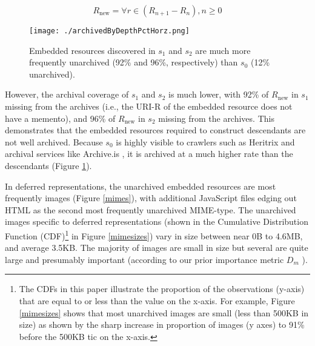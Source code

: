 \documentclass{sig-alternate}
\begin{document}
\begin{equation}
 R_{\text{new}} = \forall r \in (R_{n+1} - R_n), n \geq 0
\label{newER}
\end{equation}


\begin{figure}
\centering
\texttt{[image: ./archivedByDepthPctHorz.png]}
\caption{Embedded resources discovered in $s_1$ and $s_2$ are much more frequently unarchived (92\% and 96\%, respectively) than $s_0$ (12\% unarchived).}
\label{depth}
\end{figure}


However, the archival coverage of $s_1$ and $s_2$ is much lower, with 92\% of $R_{\text{new}}$ in $s_1$ missing from the archives (i.e., the URI-R of the embedded resource does not have a memento), and 96\% of $R_{\text{new}}$ in $s_2$ missing from the archives. This demonstrates that the embedded resources required to construct descendants are not well archived. Because $s_0$ is highly visible to crawlers such as Heritrix and archival services like Archive.is \cite{archivetoday}, it is archived at a much higher rate than the descendants (Figure \ref{depth}).



In deferred representations, the unarchived embedded resources are most frequently images (Figure \ref{mimes}), with additional JavaScript files edging out HTML as the second most frequently unarchived MIME-type. The unarchived images specific to deferred representations (shown in the Cumulative Distribution Function (CDF)\footnote{The CDFs in this paper illustrate the proportion of the observations (y-axis) that are equal to or less than the value on the x-axis. For example, Figure \ref{mimesizes} shows that most unarchived images are small (less than 500KB in size) as shown by the sharp increase in proportion of images (y axes) to 91\% before the 500KB tic on the x-axis.} in Figure \ref{mimesizes}) vary in size between near 0B to 4.6MB, and average 3.5KB. The majority of images are small in size but several are quite large and presumably important (according to our prior importance metric $D_m$ \cite{damageIJDL}).




\end{document}

